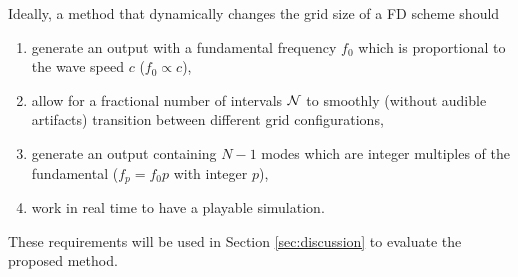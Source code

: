 
Ideally, a method that dynamically changes the grid size of a FD scheme should
\begin{enumerate}[label={r\arabic*.}]
    \item generate an output with a fundamental frequency $f_0$ %
    which is proportional to the wave speed $c$ ($f_0 \propto c$),
    \item allow for a fractional number of intervals $\mathcal{N}$ to smoothly (without audible artifacts) transition between different grid configurations,%
    \item generate an output containing $ N-1$ modes which are integer multiples of the fundamental ($f_p = f_0 p$ with integer $p$),
    \item work in real time to have a playable simulation.
\end{enumerate}
These requirements will be used in Section \ref{sec:discussion} to evaluate the proposed method.
%

